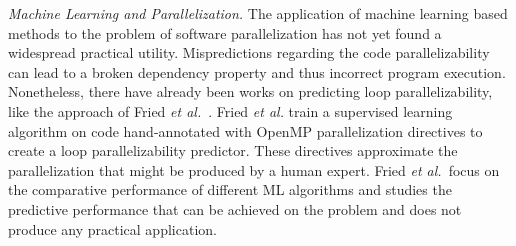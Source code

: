 \textit{Machine Learning and Parallelization.}
The application of machine learning based methods to the problem of software parallelization has not yet found a widespread practical utility. Mispredictions regarding the code parallelizability can lead to a broken dependency property and thus incorrect program execution. Nonetheless, there have already been works on predicting loop parallelizability, like the approach of Fried \emph{et al.}~\cite{fried_ea:2013:icmla}. Fried \emph{et al.} train a supervised learning algorithm on code hand-annotated with OpenMP parallelization directives to create a loop parallelizability predictor. These directives approximate the parallelization that might be produced by a human expert. Fried \emph{et al.}~focus on the comparative performance of different ML algorithms and studies the predictive performance that can be achieved on the problem and does not produce any practical application.\newline\null
